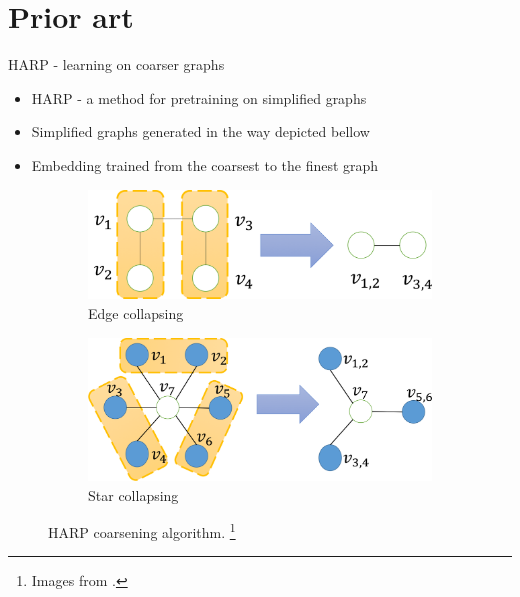 \documentclass[10pt]{beamer}
\begin{document}
\section{Prior art}

\begin{frame}{HARP - learning on coarser graphs}
	\begin{itemize}
		\item HARP - a method for pretraining on simplified graphs
		\item Simplified graphs generated in the way depicted bellow
		\item Embedding trained from the coarsest to the finest graph
	\end{itemize}
	\begin{figure}
		\centering
		\begin{subfigure}[t]{0.38\textwidth}
			\centering
			\includegraphics[width=\textwidth]{images/edge_collapsing.png}
			\caption{Edge collapsing}
		\end{subfigure}
		\hspace{2em}
		\begin{subfigure}[t]{0.38\textwidth}
			\centering
			\includegraphics[width=\textwidth]{images/star_collapsing.png}
			\caption{Star collapsing}
		\end{subfigure}
		\caption{HARP coarsening algorithm. \footnote{Images from \cite{chen_harp_2018}.}}
	\end{figure}
\end{frame}
\end{document}
